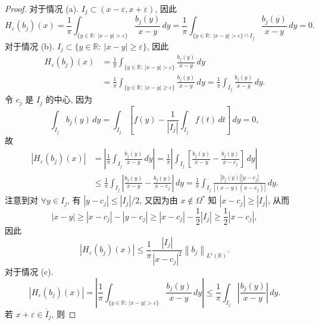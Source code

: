 \documentclass[a4paper,11pt]{article}
\theoremstyle{definition}
\begin{document}
\begin{proof}
    对于情况 (a). $ I_j \subset (x - \varepsilon, x + \varepsilon) $, 因此
    $$
        H_\varepsilon (b_j) (x) 
            = \frac{1}{\pi} \int_{\{ y \in \mathbb{R} :\ |x - y| > \varepsilon \}}
                \frac{b_j(y)}{x - y} \, dy
            = \frac{1}{\pi} \int_{\{ y \in \mathbb{R} :\ |x - y| > \varepsilon \} \cap I_j}
                \frac{b_j(y)}{x - y} \, dy
            = 0.
    $$
    对于情况 (b). $ I_j \subset \{ y \in \mathbb{R} :\ |x - y| \geq \varepsilon \} $, 因此
    \begin{align*}
        H_\varepsilon (b_j) (x) 
            &= \frac{1}{\pi} \int_{\{ y \in \mathbb{R} :\ |x - y| > \varepsilon \}} \frac{b_j(y)}{x - y} \, dy \\
            &= \frac{1}{\pi} \int_{\{ y \in \mathbb{R} :\ |x - y| \geq \varepsilon \}} \frac{b_j(y)}{x - y} \, dy
            = \frac{1}{\pi} \int_{I_j} \frac{b_j(y)}{x - y} \, dy.
    \end{align*}
    令 $ c_j $ 是 $ I_j $ 的中心, 因为 
    $$ 
        \int_{I_j} b_j(y) \, dy 
            = \int_{I_j} \left[ f(y) - \frac{1}{|I_j|} \int_{I_j} f(t) \, dt \right]  \, dy 
            = 0,
    $$
    故
    \begin{align*}
        \left| H_\varepsilon (b_j) (x)\right| 
            &= \left| \frac{1}{\pi} \int_{I_j} \frac{b_j(y)}{x - y} \, dy \right|
            = \frac{1}{\pi} \left| \int_{I_j} \left[ \frac{b_j(y)}{x - y} 
                - \frac{b_j(y)}{x - c_j} \right] \, dy \right| \\
            &\leq \frac{1}{\pi} \int_{I_j} \left| \frac{b_j(y)}{x - y} - \frac{b_j(y)}{x - c_j} \right| \, dy
            = \frac{1}{\pi} \int_{I_j} \frac{|b_j(y)||y - c_j|}{|(x - y)(x - c_j)|} \, dy.
    \end{align*}
    注意到对 $ \forall y \in I_j $, 有 $  |y - c_j| \leq |I_j |/2 $,
    又因为由 $ x \notin \Omega^* $ 知 $ |x - c_j| \geq |I_j| $, 从而
    $$
        |x - y| \geq |x - c_j| - |y - c_j|
                \geq |x - c_j| - \frac{1}{2} |I_j|
                \geq \frac{1}{2} |x - c_j|,
    $$
    因此
    $$
        \left| H_\varepsilon (b_j) (x)\right| 
            \leq \frac{1}{\pi} \frac{|I_j|}{|x - c_j|^2} \left\|b_j\right\|_{L^1(\mathbb{R})}.
    $$
    对于情况 (c). 
    $$
        |H_\varepsilon (b_j) (x)|
            = \left| \frac{1}{\pi} \int_{\{ y \in \mathbb{R} :\ |x - y| > \varepsilon \}} 
                \frac{b_j(y)}{x - y} \, dy \right| 
            \leq \frac{1}{\pi} \int_{I_j} \left| \frac{b_j(y)}{x - y} \right| \, dy.
    $$
    若 $ x + \varepsilon \in \mathring{I_j} $, 则

\end{proof}
\end{document}
